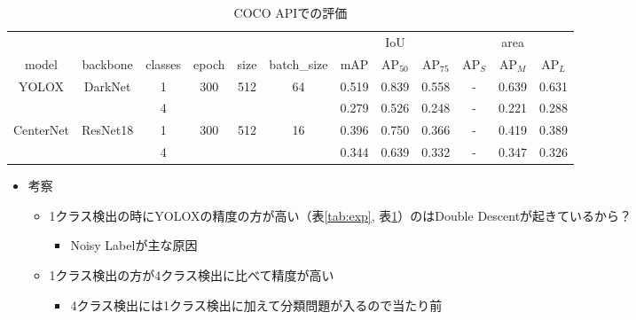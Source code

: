 \documentclass[a4j]{ujarticle}
\newcommand{\Tref}[1]{\mbox{表\ref{tab:#1}}}
\begin{document}
        \begin{table}[!h]
            \centering
            \caption{COCO APIでの評価}
            \label{tab:coco}
            \begin{tabular}{cccccc|ccc|ccc} \hline
                & & & & & & & IoU & & & area\footnotemark & \\
                model & backbone & classes & epoch & size & batch\_size & mAP & AP$_{50}$ & AP$_{75}$ & AP$_S$ & AP$_M$ & AP$_L$ \\ \hline
                \multirow{2}{*}{YOLOX\cite{yolox}} & \multirow{2}{*}{DarkNet} & 1 & \multirow{2}{*}{300} & \multirow{2}{*}{512} & \multirow{2}{*}{64} & 0.519 & 0.839 & 0.558 & - & 0.639 & 0.631 \\
                & & 4 & & & & 0.279 & 0.526 & 0.248 & - & 0.221 & 0.288 \\ \hline
                \multirow{2}{*}{CenterNet\cite{centernet}} & \multirow{2}{*}{ResNet18} & 1 & \multirow{2}{*}{300} & \multirow{2}{*}{512} & \multirow{2}{*}{16} & 0.396 & 0.750 & 0.366 & - & 0.419 & 0.389 \\
                & & 4 & & & & 0.344 & 0.639 & 0.332 & - & 0.347 & 0.326 \\ \hline
            \end{tabular}
        \end{table}

        \begin{itemize}
            \item 考察
            \begin{itemize}
                \item 1クラス検出の時にYOLOX\cite{yolox}の精度の方が高い（\Tref{exp}, \Tref{coco}）のはDouble Descent\cite{double_descent}が起きているから？
                \begin{itemize}
                    \item Noisy Labelが主な原因
                \end{itemize}
                \item 1クラス検出の方が4クラス検出に比べて精度が高い
                \begin{itemize}
                    \item 4クラス検出には1クラス検出に加えて分類問題が入るので当たり前
                \end{itemize}
            \end{itemize}
        \end{itemize}

\end{document}
